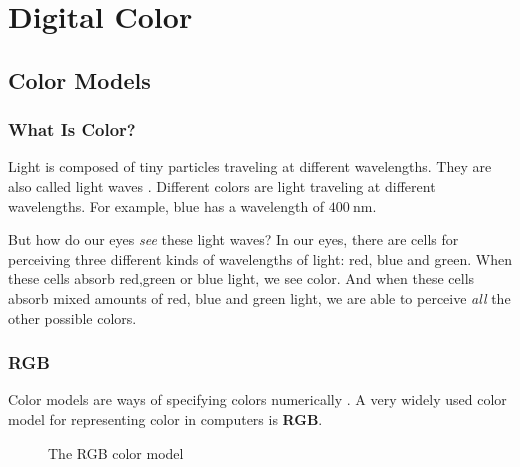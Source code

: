 \begin{comment}
  
\end{comment}

\chapter{Digital Color}
\label{cha:color}

\begin{refsection}

  \section{Color Models}
  \label{sec:color-models}

  \subsection{What Is Color?}
  \label{sec:what-color}

  \newcommand{\bluewave}{\ensuremath{\SI{400}{\nano\meter}}}

  Light is composed of tiny particles traveling at different
  wavelengths. They are also called light
  waves \cite{neider93:_openg_progr_guide}.
  Different colors are light traveling at different wavelengths. For
  example, blue has a wavelength of
  \bluewave \cite{ohlsson99:_digit_bild_kreat}.

  But how do our eyes \textit{see} these light waves? In our eyes,
  there are cells for perceiving three different kinds of wavelengths
  of light: red, blue and green. When these cells absorb red,green or
  blue light, we see color. And when these cells absorb mixed amounts
  of red, blue and green light, we are able to perceive \textit{all}
  the other possible colors.

  \subsection{RGB}
  \label{sec:rgb}

  Color models are ways of specifying colors
  numerically \cite{fadgi11:color_model}. A very widely used color
  model for representing color in computers is \textbf{RGB}.

  \begin{figure}
    \centering
    \caption{The RGB color model}
    \label{fig:rgb}
  \end{figure}


\end{refsection}
